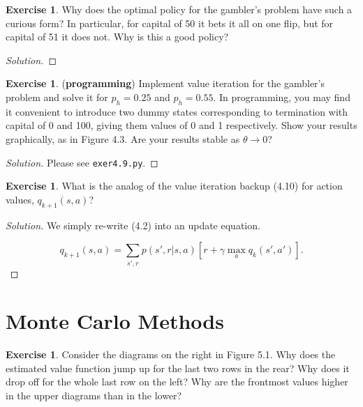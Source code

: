 \documentclass[oneside,11pt]{article}
\theoremstyle{definition}
\newtheorem{exer}[thm]{Exercise}
\newenvironment{solution}
{\renewcommand\qedsymbol{$\blacksquare$}\begin{proof}[Solution]} {\end{proof}}
\begin{document}
\begin{exer}
Why does the optimal policy for the gambler's problem have such a curious form? In particular, for capital of 50 it bets it all on one flip, but for capital of 51 it does not. Why is this a good policy?
\end{exer}

\begin{shaded}
\begin{solution} 

\end{solution} 
\end{shaded}


\begin{exer}
(\textbf{programming}) Implement value iteration for the gambler's problem and solve it for $p_h = 0.25$ and $p_h = 0.55$. In programming, you may find it convenient to introduce two dummy states corresponding to termination with capital of 0 and 100, giving them values of 0 and 1 respectively. Show your results graphically, as in Figure 4.3. Are your results stable as $\theta \to 0$?
\end{exer}

\begin{shaded}
\begin{solution} 
Please see \texttt{exer4.9.py}.
\end{solution} 
\end{shaded}


\begin{exer}
What is the analog of the value iteration backup (4.10) for action values, $q_{k+1}(s, a)$?
\end{exer}

\begin{shaded}
\begin{solution} 

We simply re-write (4.2) into an update equation.

\[ q_{k+1}(s,a) = \sum_{s',r} p(s',r | s,a ) \left [ r + \gamma \max_a q_{k}(s',a') \right ].  \]

\end{solution} 
\end{shaded}

\section{Monte Carlo Methods}

\begin{exer}
Consider the diagrams on the right in Figure 5.1. Why does the estimated value function jump up for the last two rows in the rear? Why does it drop off for the whole last row on the left? Why are the frontmost values higher in the upper diagrams than in the lower?
\end{exer}
\end{document}
